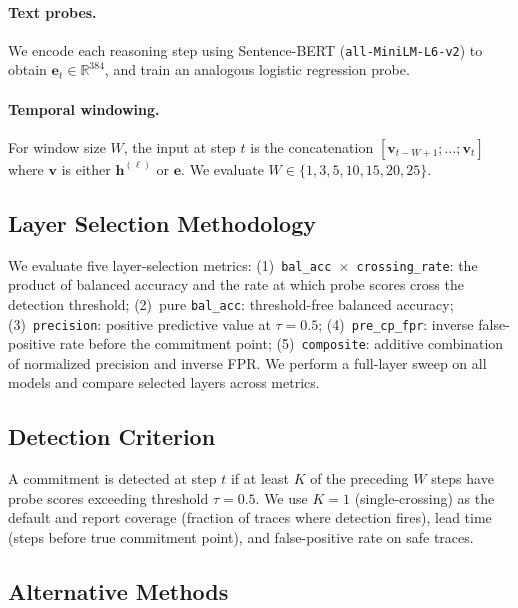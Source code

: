 \documentclass[11pt]{article}
\begin{document}
\paragraph{Text probes.}
We encode each reasoning step using Sentence-BERT (\texttt{all-MiniLM-L6-v2}) to obtain $\mathbf{e}_t \in \mathbb{R}^{384}$, and train an analogous logistic regression probe.

\paragraph{Temporal windowing.}
For window size $W$, the input at step $t$ is the concatenation $[\mathbf{v}_{t-W+1}; \ldots; \mathbf{v}_t]$ where $\mathbf{v}$ is either $\mathbf{h}^{(\ell)}$ or $\mathbf{e}$.
We evaluate $W \in \{1, 3, 5, 10, 15, 20, 25\}$.

\subsection{Layer Selection Methodology}
\label{sec:layer_selection}

We evaluate five layer-selection metrics:
(1)~\texttt{bal\_acc $\times$ crossing\_rate}: the product of balanced accuracy and the rate at which probe scores cross the detection threshold;
(2)~pure \texttt{bal\_acc}: threshold-free balanced accuracy;
(3)~\texttt{precision}: positive predictive value at $\tau=0.5$;
(4)~\texttt{pre\_cp\_fpr}: inverse false-positive rate before the commitment point;
(5)~\texttt{composite}: additive combination of normalized precision and inverse FPR.
We perform a full-layer sweep on all models and compare selected layers across metrics.

\subsection{Detection Criterion}
\label{sec:detection}

A commitment is detected at step $t$ if at least $K$ of the preceding $W$ steps have probe scores exceeding threshold $\tau = 0.5$.
We use $K=1$ (single-crossing) as the default and report coverage (fraction of traces where detection fires), lead time (steps before true commitment point), and false-positive rate on safe traces.

\subsection{Alternative Methods}
\label{sec:alternatives}
\end{document}
